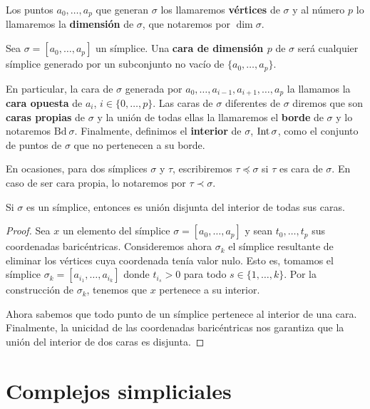 Los puntos $a_{0}, \ldots, a_{p}$ que generan $\sigma$ los llamaremos \textbf{vértices}
de $\sigma$ y al número $p$ lo llamaremos la \textbf{dimensión} de $\sigma$, que
notaremos por $\dim \sigma$.

\begin{definicion}
	Sea $\sigma=[a_{0}, \ldots, a_{p}]$ un símplice. Una \textbf{cara de dimensión
		$p$} de $\sigma$ será cualquier símplice generado por un subconjunto no vacío de
	$\{a_{0}, \ldots, a_{p}\}$.
\end{definicion}
En particular, la cara de $\sigma$ generada por $a_{0}, \ldots, a_{i-1}, a_{i+1},
\ldots, a_{p}$ la llamamos la \textbf{cara opuesta} de $a_{i}$, $i \in \{0, \ldots
, p\}$. Las caras de $\sigma$ diferentes de $\sigma$ diremos que son \textbf{caras
	propias} de $\sigma$ y la unión de todas ellas la llamaremos el \textbf{borde}
de $\sigma$ y lo notaremos $\text{Bd}\ \sigma$. Finalmente, definimos el \textbf{interior}
de $\sigma$, $\operatorname{Int} \sigma$, como el conjunto de puntos de $\sigma$ que no pertenecen
a su borde.

En ocasiones, para dos símplices $\sigma$ y $\tau$, escribiremos $\tau \preceq \sigma$
si $\tau$ es cara de $\sigma$. En caso de ser cara propia, lo notaremos por $\tau
\prec \sigma$.

\begin{proposicion}
	\label{prop:union-disjunta-simplices} Si $\sigma$ es un símplice, entonces es
	unión disjunta del interior de todas sus caras.
\end{proposicion}
\begin{proof}
	Sea $x$ un elemento del símplice $\sigma = [a_{0},\ldots,a_{p}]$ y sean $t_{0},
	\ldots ,t_{p}$ sus coordenadas baricéntricas. Consideremos ahora $\sigma_{k}$
	el símplice resultante de eliminar los vértices cuya coordenada tenía valor
	nulo. Esto es, tomamos el símplice $\sigma_{k}= [a_{i_1}, \ldots, a_{i_k}]$
	donde $t_{i_s}> 0$ para todo $s \in \{1, \ldots, k\}$. Por la construcción de $\sigma
	_{k}$, tenemos que $x$ pertenece a su interior.
	
	Ahora sabemos que todo punto de un símplice pertenece al interior de una cara.
	Finalmente, la unicidad de las coordenadas baricéntricas nos garantiza que la
	unión del interior de dos caras es disjunta.
\end{proof}

\section{Complejos simpliciales}

